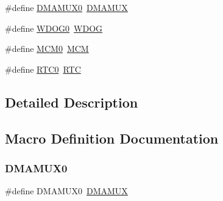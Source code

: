 \begin{DoxyCompactItemize}
\item 
\#define \mbox{\hyperlink{group___s_d_k___compatibility___symbols_gab65f26d32cad2fbb14838d5c831203ec}{D\+M\+A\+M\+U\+X0}}~\mbox{\hyperlink{group___d_m_a_m_u_x___register___masks_ga0b7b7bd666a76aa791434bb59ea03693}{D\+M\+A\+M\+UX}}
\item 
\#define \mbox{\hyperlink{group___s_d_k___compatibility___symbols_ga2786c4aa52de96f5701346b6cb16ac97}{W\+D\+O\+G0}}~\mbox{\hyperlink{group___w_d_o_g___register___masks_gab938901a5fa5443253fc293ebd0399e3}{W\+D\+OG}}
\item 
\#define \mbox{\hyperlink{group___s_d_k___compatibility___symbols_ga08026cdde4ddee9ef292a574d39d8107}{M\+C\+M0}}~\mbox{\hyperlink{group___m_c_m___register___masks_ga4cd2dcee5e786e36844ed653cfa40096}{M\+CM}}
\item 
\#define \mbox{\hyperlink{group___s_d_k___compatibility___symbols_gaf7668f810f5e18547322362f510366e8}{R\+T\+C0}}~\mbox{\hyperlink{group___r_t_c___register___masks_ga5359a088f5d8b20ce74d920e46059304}{R\+TC}}
\end{DoxyCompactItemize}


\subsection{Detailed Description}


\subsection{Macro Definition Documentation}
\mbox{\label{group___s_d_k___compatibility___symbols_gab65f26d32cad2fbb14838d5c831203ec}} 
\subsubsection{\texorpdfstring{D\+M\+A\+M\+U\+X0}{DMAMUX0}}
{\footnotesize\ttfamily \#define D\+M\+A\+M\+U\+X0~\mbox{\hyperlink{group___d_m_a_m_u_x___register___masks_ga0b7b7bd666a76aa791434bb59ea03693}{D\+M\+A\+M\+UX}}}

\mbox{\label{group___s_d_k___compatibility___symbols_gaa03782009be87fe8d39c2b87877d915d}} 
